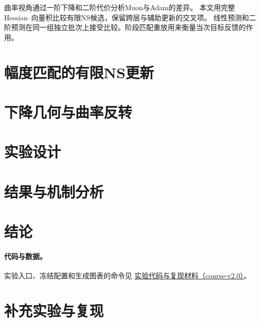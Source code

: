 \documentclass[UTF8,a4paper,11pt]{ctexart}
\begin{document}
曲率视角通过一阶下降和二阶代价分析Muon与Adam的差异\cite{wang2026curvature}。
本文用完整Hessian--向量积比较有限NS候选，保留跨层与辅助更新的交叉项。
线性预测和二阶预测在同一组独立批次上接受比较。阶段匹配重放用来衡量当次目标反馈的作用。

\section{幅度匹配的有限NS更新}\label{sec:v2method}

\section{下降几何与曲率反转}\label{sec:v2theory}

\section{实验设计}\label{sec:v2protocol}

\section{结果与机制分析}\label{sec:v2results}

\FloatBarrier
\section{结论}

\paragraph{代码与数据。}
实验入口、冻结配置和生成图表的命令见
\href{https://github.com/Higgsfield-DHY/optimization-course-muon/tree/course-v2.0}{实验代码与复现材料（course-v2.0）}。


\appendix

\section{补充实验与复现}

\end{document}
